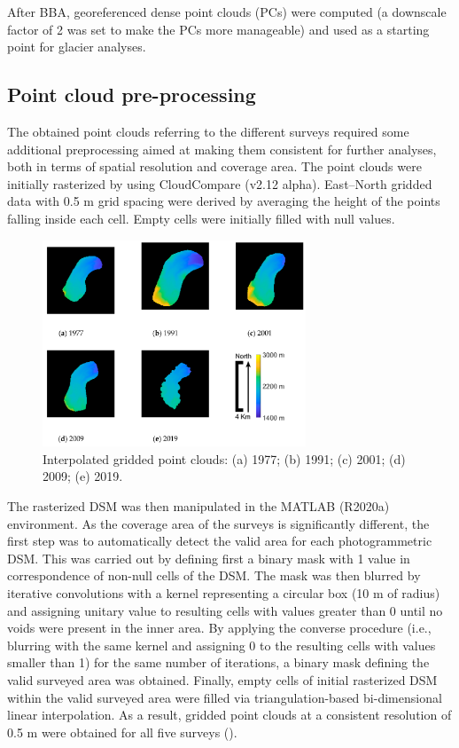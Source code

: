 After BBA, georeferenced dense point clouds (PCs) were computed (a downscale factor of 2 was set to make the PCs more manageable) and used as a starting point for glacier analyses. 


\subsection{Point cloud pre-processing}{\label{sec:2:pcd_preproc}}
The obtained point clouds referring to the different surveys required some additional preprocessing aimed at making them consistent for further analyses, both in terms of spatial resolution and coverage area.
The point clouds were initially rasterized by using CloudCompare (v2.12 alpha).
East–North gridded data with 0.5 m grid spacing were derived by averaging the height of the points falling inside each cell. 
Empty cells were initially filled with null values.

\begin{figure}[ht]
    \centering
    \includegraphics[width=0.7\textwidth]{pcd_rasterized.png}
    \caption{Interpolated gridded point clouds: (a) 1977; (b) 1991; (c) 2001; (d) 2009; (e) 2019.}
    \label{fig:2:pcd_rasterzed}
\end{figure}

The rasterized DSM was then manipulated in the MATLAB (R2020a) environment.
As the coverage area of the surveys is significantly different, the first step was to automatically detect the valid area for each photogrammetric DSM. 
This was carried out by defining first a binary mask with 1 value in correspondence of non-null cells of the DSM. 
The mask was then blurred by iterative convolutions with a kernel representing a circular box (10 m of radius) and assigning unitary value to resulting cells with values greater than 0 until no voids were present in the inner area.
By applying the converse procedure (i.e., blurring with the same kernel and assigning 0 to the resulting cells with values smaller than 1) for the same number of iterations, a binary mask defining the valid surveyed area was obtained.
Finally, empty cells of initial rasterized DSM within the valid surveyed area were filled via triangulation-based bi-dimensional linear interpolation.
As a result, gridded point clouds at a consistent resolution of 0.5 m were obtained for all five surveys ().

